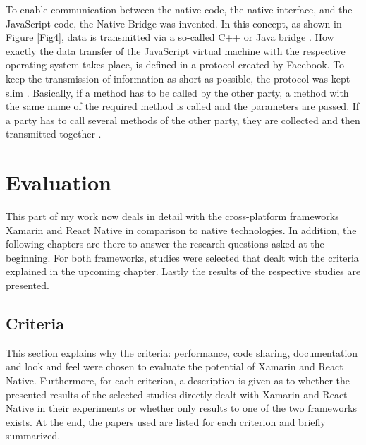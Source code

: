 \documentclass[Bachelor,BIF,english]{twbook}
\begin{document}
To enable communication between the native code, the native interface, and the JavaScript code, the Native Bridge was invented. In this concept, as shown in Figure \ref{Fig4}, data is transmitted via a so-called C++ or Java bridge \cite[p.~28]{ZubaBernhard2017EdPb}. How exactly the data transfer of the JavaScript virtual machine with the respective operating system takes place, is defined in a protocol created by Facebook. To keep the transmission of information as short as possible, the protocol was kept slim \cite[p.~9-10]{Hansson_Vidhall_2016} \cite[p.~28]{ZubaBernhard2017EdPb}. Basically, if a method has to be called by the other party, a method with the same name of the required method is called and the parameters are passed. If a party has to call several methods of the other party, they are collected and then transmitted together \cite[p.~29]{ZubaBernhard2017EdPb}.

\newpage
\chapter{Evaluation}
This part of my work now deals in detail with the cross-platform frameworks Xamarin and React Native in comparison to native technologies. In addition, the following chapters are there to answer the research questions asked at the beginning. For both frameworks, studies were selected that dealt with the criteria explained in the upcoming chapter. Lastly the results of the respective studies are presented.

\section{Criteria}
This section explains why the criteria: performance, code sharing, documentation and look and feel were chosen to evaluate the potential of Xamarin and React Native. Furthermore, for each criterion, a description is given as to whether the presented results of the selected studies directly dealt with Xamarin and React Native in their experiments or whether only results to one of the two frameworks exists. At the end, the papers used are listed for each criterion and briefly summarized.
\end{document}
